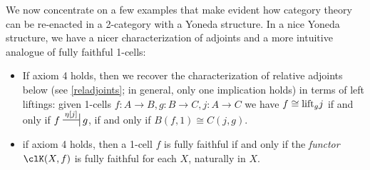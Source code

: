 We now concentrate on a few examples that make evident how category theory can
be re-enacted in a 2-category with a Yoneda structure. In a nice Yoneda
structure, we have a nicer characterization of adjoints and a more intuitive
analogue of fully faithful 1-cells:
\begin{itemize}
	\item If axiom 4 holds, then we recover the characterization of relative
adjoints below (see \ref{reladjoints}; in general, only one implication holds)
in terms of left liftings: given 1-cells $f : A\to B, g : B\to C, j : A \to C$
we have $f\cong \text{lift}_gj$ if and only if $f \adjunct{\eta[j]}{}g$, \ie if and
only if $B(f,1)\cong C(j,g)$.
	\item if axiom 4 holds, then a 1-cell $f$ is fully faithful if
and only if the \emph{functor} $\clK(X,f)$ is fully faithful for each $X$,
naturally in $X$.
\end{itemize}
